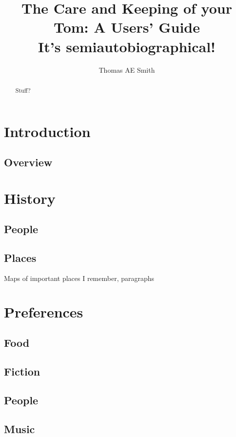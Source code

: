 \documentclass[openany,oneside]{memoir}
\title{The Care and Keeping of your Tom: A Users' Guide \\ \small It's semiautobiographical!}
\author{Thomas AE Smith}
\begin{document}
\maketitle
\begin{abstract}
Stuff?
\end{abstract}
\chapter{Introduction}
	\section{Overview}
\chapter{History}
	\section{People}
	\section{Places}
		Maps of important places I remember, paragraphs
\chapter{Preferences}
	\section{Food}
	\section{Fiction}
	\section{People}
	\section{Music}
\end{document}
